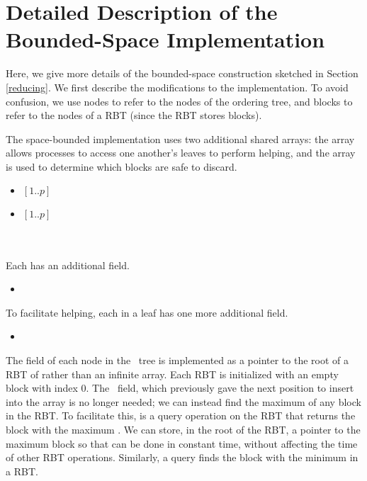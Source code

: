 
\section{Detailed Description of the Bounded-Space Implementation}
\label{reducing-details}


\renewcommand{\algorithmiccomment}[1]{\hfill\eqparbox{COMMENTSINGLEAPP}{\com\ #1}}

Here, we give more details of the bounded-space construction sketched in Section \ref{reducing}.
We first describe the modifications to the implementation.
To avoid confusion, we use nodes to refer to the nodes of the ordering tree, and blocks to refer
to the nodes of a RBT (since the RBT stores blocks).

The space-bounded implementation uses two additional shared arrays:
the  array allows processes to access one another's leaves to perform helping, and
the  array is used to determine which blocks are safe to discard.
\begin{itemize}
\item {} $[1..p]$ 
\item {} $[1..p]$ \\
\mbox{ }\\
\mbox{ }
\end{itemize}
Each  has an additional field.
\begin{itemize}
\item {}  
\end{itemize}
To facilitate helping, each  in a leaf has one more additional field.
\begin{itemize}
\item {}  
\end{itemize}
The  field of each node in the \ordering\ tree is implemented as a pointer to the root of a RBT of  rather than an infinite array.  
Each RBT is initialized with an empty block with index 0.
The \head\ field, which previously gave the next position to insert into the  array is no
longer needed; we can instead find the maximum  of any block in the RBT.
To facilitate this,  is a query operation on the RBT that 
returns the block with the maximum .
We can store, in the root of the RBT, a pointer to the maximum block so that 
can be done in constant time, without affecting the time of other RBT operations.
Similarly, a  query finds the block with the minimum  in a RBT.


